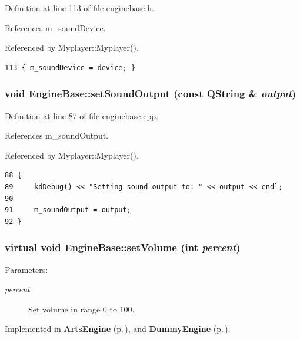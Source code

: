 Definition at line 113 of file enginebase.h.

References m\_\-sound\-Device.

Referenced by Myplayer::Myplayer().



\footnotesize\begin{verbatim}113 { m_soundDevice = device; }
\end{verbatim}\normalsize 
{}
\subsubsection{\setlength{\rightskip}{0pt plus 5cm}void Engine\-Base::set\-Sound\-Output (const QString \& {\em output})\hspace{0.3cm}{\tt  [virtual]}}\label{classEngineBase_EngineBasea25}




Definition at line 87 of file enginebase.cpp.

References m\_\-sound\-Output.

Referenced by Myplayer::Myplayer().



\footnotesize\begin{verbatim}88 {
89     kdDebug() << "Setting sound output to: " << output << endl;
90     
91     m_soundOutput = output;
92 }
\end{verbatim}\normalsize 
{}
\subsubsection{\setlength{\rightskip}{0pt plus 5cm}virtual void Engine\-Base::set\-Volume (int {\em percent})\hspace{0.3cm}{\tt  [pure virtual, slot]}}\label{classEngineBase_EngineBasei4}


\begin{Desc}
\item[Parameters:]
\begin{description}
\item[{\em percent}]Set volume in range 0 to 100. \end{description}
\end{Desc}


Implemented in {\bf Arts\-Engine} {\rm (p.\,\pageref{classArtsEngine_ArtsEnginei5})}, and {\bf Dummy\-Engine} {\rm (p.\,\pageref{classDummyEngine_DummyEngined12})}.

